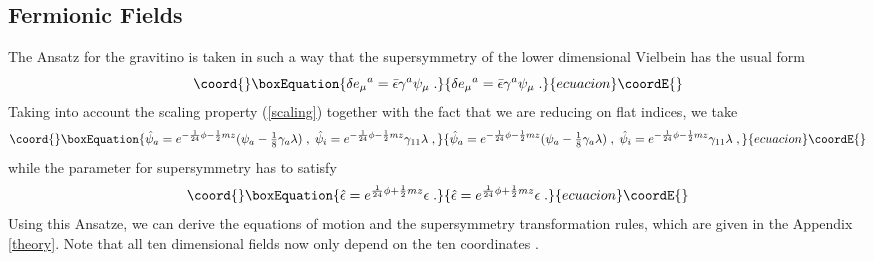 \documentclass[a4paper,12pt]{article}
\providecommand{\ft}[2]{{\textstyle\frac{#1}{#2}}}
\begin{document}
\subsection{Fermionic Fields}
The Ansatz for the gravitino is taken in such a way that the supersymmetry of the lower dimensional Vielbein has the usual form
\begin{equation}\coord{}\boxEquation{\label{viel}
\delta e_\mu {}^a= \bar{\epsilon} \gamma^a \psi_\mu\; .
}{\delta e_\mu {}^a= \bar{\epsilon} \gamma^a \psi_\mu\; .
}{ecuacion}\coordE{}\end{equation}
Taking into account the scaling property (\ref{scaling}) together with the fact that we are reducing on flat indices, we take
\begin{equation}\coord{}\boxEquation{
\hat{\psi}_a=e^{-\frac{1}{24} \phi -\frac{1}{2}mz}(\psi_a-\ft18 \gamma_a \lambda)\; , \;
\hat{\psi}_{i}=e^{-\frac{1}{24} \phi -\frac{1}{2}mz}\gamma_{11} \lambda\; ,
}{
\hat{\psi}_a=e^{-\frac{1}{24} \phi -\frac{1}{2}mz}(\psi_a-\ft18 \gamma_a \lambda)\; , \;
\hat{\psi}_{i}=e^{-\frac{1}{24} \phi -\frac{1}{2}mz}\gamma_{11} \lambda\; ,
}{ecuacion}\coordE{}\end{equation}
while the parameter for supersymmetry has to satisfy
\begin{equation}\coord{}\boxEquation{\label{ansatzsusy}
\hat{\epsilon}=e^{\frac{1}{24} \phi +\frac{1}{2}mz}\epsilon\; .
}{\hat{\epsilon}=e^{\frac{1}{24} \phi +\frac{1}{2}mz}\epsilon\; .
}{ecuacion}\coordE{}\end{equation}
Using this Ansatze, we can derive the equations of motion and the supersymmetry transformation rules, which are given in the Appendix \ref{theory}. Note that all ten dimensional fields now only depend on the ten coordinates \coordHE{}.
\end{document}

